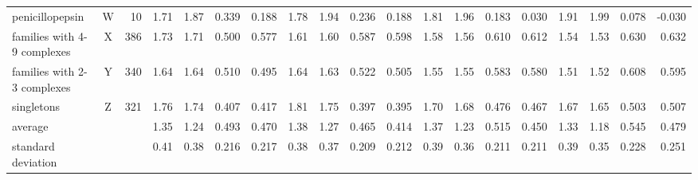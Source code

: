 \documentclass[twocolumn]{bmcart}
\begin{document}
\begin{backmatter}
\begin{sidewaystable}[ht]
\begin{tabular}{lcrrrrrrrrrrrrrrrrr}
penicillopepsin                & W &  10 & 1.71 & 1.87 & 0.339 & 0.188 & 1.78 & 1.94 & 0.236 & 0.188 & 1.81 & 1.96 & 0.183 & 0.030 & 1.91 & 1.99 & 0.078 &-0.030\\
families with 4-9 complexes    & X & 386 & 1.73 & 1.71 & 0.500 & 0.577 & 1.61 & 1.60 & 0.587 & 0.598 & 1.58 & 1.56 & 0.610 & 0.612 & 1.54 & 1.53 & 0.630 & 0.632\\
families with 2-3 complexes    & Y & 340 & 1.64 & 1.64 & 0.510 & 0.495 & 1.64 & 1.63 & 0.522 & 0.505 & 1.55 & 1.55 & 0.583 & 0.580 & 1.51 & 1.52 & 0.608 & 0.595\\
singletons                     & Z & 321 & 1.76 & 1.74 & 0.407 & 0.417 & 1.81 & 1.75 & 0.397 & 0.395 & 1.70 & 1.68 & 0.476 & 0.467 & 1.67 & 1.65 & 0.503 & 0.507\\
average                        &   &     & 1.35 & 1.24 & 0.493 & 0.470 & 1.38 & 1.27 & 0.465 & 0.414 & 1.37 & 1.23 & 0.515 & 0.450 & 1.33 & 1.18 & 0.545 & 0.479\\
standard deviation             &   &     & 0.41 & 0.38 & 0.216 & 0.217 & 0.38 & 0.37 & 0.209 & 0.212 & 0.39 & 0.36 & 0.211 & 0.211 & 0.39 & 0.35 & 0.228 & 0.251\\
\hline
\end{tabular}
\end{sidewaystable}


\end{backmatter}
\end{document}
